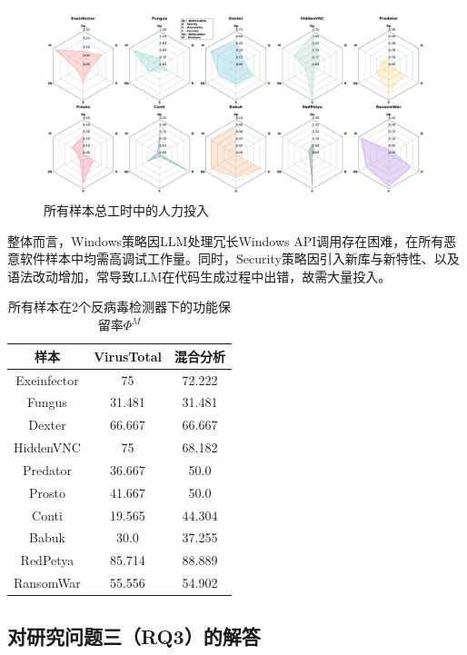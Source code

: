 \begin{figure}[htb]
	\centering
	\includegraphics[width=1.15\textwidth]{figures/figure4.png}
	\caption{所有样本总工时中的人力投入}
	\label{fig:5.4}
\end{figure}


整体而言，Windows策略因LLM处理冗长Windows API调用存在困难，在所有恶意软件样本中均需高调试工作量。同时，Security策略因引入新库与新特性、以及语法改动增加，常导致LLM在代码生成过程中出错，故需大量投入。

\begin{table}[htbp]
	\centering
	\caption{所有样本在2个反病毒检测器下的功能保留率$\Phi^{M}$}
	\label{tab:5.3}
	\begin{tabular*}{\textwidth}{@{\extracolsep{\fill}}ccc}
		\toprule
		样本 & VirusTotal & 混合分析 \\
		\midrule
		Exeinfector & 75 & 72.222 \\
		Fungus & 31.481 & 31.481 \\
		Dexter & 66.667 & 66.667 \\
		HiddenVNC & 75 & 68.182 \\
		Predator & 36.667 & 50.0 \\
		Prosto & 41.667 & 50.0 \\
		Conti & 19.565 & 44.304 \\
		Babuk & 30.0 & 37.255 \\
		RedPetya & 85.714 & 88.889 \\
		RansomWar & 55.556 & 54.902 \\
		\bottomrule
	\end{tabular*}
\end{table}

\subsection{对研究问题三（RQ3）的解答}

